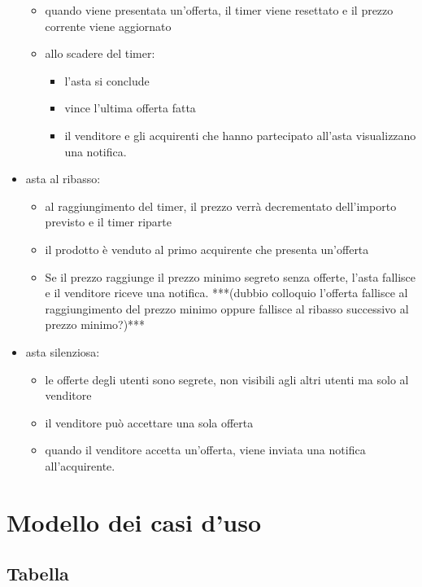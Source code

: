 \begin{itemize}
\begin{itemize}[label={\tiny$\blacksquare$}]
		      \item quando viene presentata un'offerta, il timer viene resettato e il prezzo corrente viene aggiornato
		      \item allo scadere del timer:
		            \begin{itemize}[label={\tiny$-$}]
			            \item l'asta si conclude
			            \item vince l'ultima offerta fatta
			            \item il venditore e gli acquirenti che hanno partecipato all'asta visualizzano una notifica.
		            \end{itemize}
	      \end{itemize}
	\item asta al ribasso:
	      \begin{itemize}[label={\tiny$\blacksquare$}]
		      \item al raggiungimento del timer, il prezzo verrà decrementato dell'importo previsto e il timer riparte
		      \item il prodotto è venduto al primo acquirente che presenta un'offerta
		      \item Se il prezzo raggiunge il prezzo minimo segreto senza offerte, l'asta fallisce e il venditore riceve una notifica. ***(dubbio colloquio l'offerta fallisce al raggiungimento del prezzo minimo oppure fallisce al ribasso successivo al prezzo minimo?)***
	      \end{itemize}
	\item asta silenziosa:
	      \begin{itemize}[label={\tiny$\blacksquare$}]
		      \item le offerte degli utenti sono segrete, non visibili agli altri utenti ma solo al venditore
		      \item il venditore può accettare una sola offerta
		      \item quando il venditore accetta un'offerta, viene inviata una notifica all'acquirente.
	      \end{itemize}

\end{itemize}

\newpage

\section{Modello dei casi d'uso}
\subsection{Tabella}

